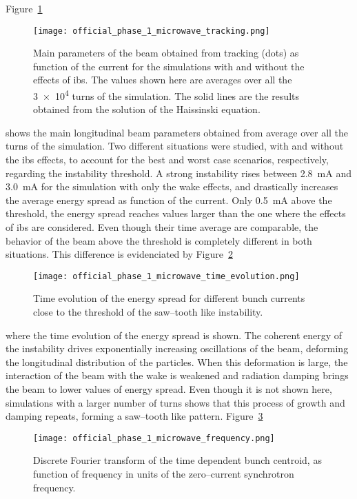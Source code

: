     Figure~\ref{fig:ph1_microwave_tracking}
    \begin{figure}
        \centering
        \texttt{[image: official\_phase\_1\_microwave\_tracking.png]}
        \caption[Longitudinal beam parameters obtained from tracking.]{Main parameters of the beam obtained from tracking (dots) as function of the current for the simulations with and without the effects of \gls{ibs}. The values shown here are averages over all the \num{3e4} turns of the simulation. The solid lines are the results obtained from the solution of the Haissinski equation.}
        \label{fig:ph1_microwave_tracking}
    \end{figure}
    shows the main longitudinal beam parameters obtained from average over all the turns of the simulation. Two different situations were studied, with and without the \gls{ibs} effects, to account for the best and worst case scenarios, respectively, regarding the instability threshold. A strong instability rises between \SI{2.8}{\milli\ampere} and \SI{3.0}{\milli\ampere} for the simulation with only the wake effects, and drastically increases the average energy spread as function of the current. Only \SI{0.5}{\milli\ampere} above the threshold, the energy spread reaches values larger than the one where the effects of \gls{ibs} are considered. Even though their time average are comparable, the behavior of the beam above the threshold is completely different in both situations. This difference is evidenciated by
    Figure~\ref{fig:ph1_microwave_time_evolution}
    \begin{figure}
        \centering
        \texttt{[image: official\_phase\_1\_microwave\_time\_evolution.png]}
        \caption{Time evolution of the energy spread for different bunch currents close to the threshold of the saw--tooth like instability.}
        \label{fig:ph1_microwave_time_evolution}
    \end{figure}
    where the time evolution of the energy spread is shown. The coherent energy of the instability drives exponentially increasing oscillations of the beam, deforming the longitudinal distribution of the particles. When this deformation is large, the interaction of the beam with the wake is weakened and radiation damping brings the beam to lower values of energy spread. Even though it is not shown here, simulations with a larger number of turns shows that this process of growth and damping repeats, forming a saw--tooth like pattern.
    Figure~\ref{fig:ph1_microwave_frequency}
    \begin{figure}
        \centering
        \texttt{[image: official\_phase\_1\_microwave\_frequency.png]}
        \caption{Discrete Fourier transform of the time dependent bunch centroid, as function of frequency in units of the zero--current synchrotron frequency.}
        \label{fig:ph1_microwave_frequency}
    \end{figure}
